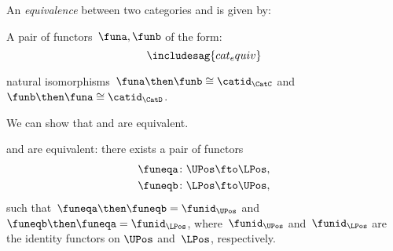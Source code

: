 \begin{definition}
\label{def:equivalence_cat}
An \emph{equivalence} between two categories \CatC and \CatD is given by:
\begin{compactenum}
\item A pair of functors~$\funa,\funb$ of the form:
    \begin{equation}
    \includesag{cat_equiv}
    \end{equation}
\item natural isomorphisms~$\funa\then \funb\cong \catid_\CatC$ and~$\funb\then \funa\cong \catid_\CatD$.
\end{compactenum}
\end{definition}


We can show that \UPos and \LPos are equivalent.

\begin{lemma}
\label{lem:ulposequiv}
\UPos and \LPos are equivalent: there exists a pair of functors
\begin{equation}
    \begin{aligned}
    \funeqa\colon \UPos&\fto \LPos,\\
    \funeqb\colon \LPos&\fto \UPos,
    \end{aligned}
\end{equation}
such that~$\funeqa \then \funeqb=\funid_{\UPos}$ and~$\funeqb \then \funeqa=\funid_{\LPos}$, where~$\funid_{\UPos}$ and~$\funid_{\LPos}$ are the identity functors on $\UPos$ and~$\LPos$, respectively.
\end{lemma}

